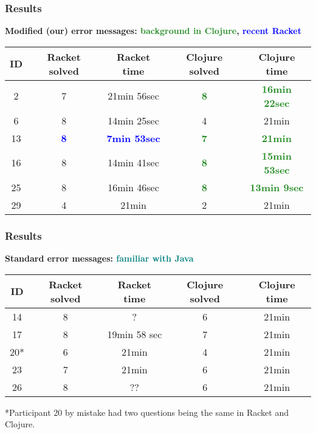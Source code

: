 \documentclass{beamer}
\newcommand{\comment}[1]{{\bf \tt  {#1}}}
\newcommand{\emcomment}[1]{\textcolor{ForestGreen}{\comment{Elena: {#1}}}}
\newcommand{\R}[1]{\textcolor{blue}{\bf {#1}}}
\newcommand{\Cl}[1]{\textcolor{ForestGreen}{\bf {#1}}}
\newcommand{\Java}[1]{\textcolor{Teal}{\bf {#1}}}
\begin{document}
\begin{frame}
\frametitle{Results}
{\bf Modified (our) error messages:  \Cl{background in Clojure}, \R{recent Racket}}
\vspace{0.1in}

\begin{tabular}{c | c| c| c | c }
\hline
{\bf ID} & {\bf Racket solved} & {\bf Racket time} & {\bf Clojure solved} & {\bf Clojure time} \\
\hline 
2 & 7  & 21min 56sec &  \Cl{8} & \Cl{16min 22sec} \\
6 &  8  & 14min 25sec &  4  &  21min \\
13 &  \R{8}  & \R{7min 53sec} &  \Cl{7}  &  \Cl{21min} \\
16 &  8  & 14min 41sec &  \Cl{8}  &  \Cl{15min 53sec} \\
25 &  8  & 16min 46sec &  \Cl{8}  &  \Cl{13min 9sec} \\
29 &  4  & 21min &  2  &  21min \\
\hline
\end{tabular}
\end{frame}

\begin{frame}
\frametitle{Results}
{\bf Standard error messages: \Java{familiar with Java}} 
\vspace{0.1in}

\begin{tabular}{c | c| c| c | c }
\hline
{\bf ID} & {\bf Racket solved} & {\bf Racket time} & {\bf Clojure solved} & {\bf Clojure time} \\
\hline 
14 &  8 & ? &  6  &  21min \\
17 &  8 & 19min 58 sec &  7 &  21min \\
20* &  6 & 21min &  4 &  21min \\
23 &  7 & 21min &  6  &  21min \\
26 &  8 & ?? &  6 &  21min \\
\hline
\end{tabular}

*Participant 20 by mistake had two questions being the same in Racket and Clojure. 
\end{frame}
\end{document}
